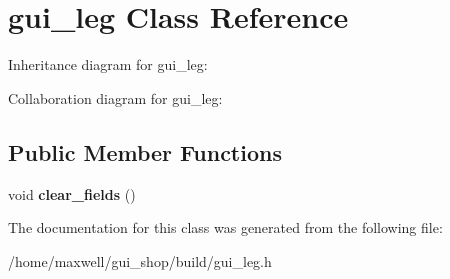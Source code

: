 \hypertarget{classgui__leg}{}\section{gui\+\_\+leg Class Reference}
\label{classgui__leg}


Inheritance diagram for gui\+\_\+leg\+:


Collaboration diagram for gui\+\_\+leg\+:
\subsection*{Public Member Functions}
\begin{DoxyCompactItemize}
\item 
void {\bfseries clear\+\_\+fields} ()\hypertarget{classgui__leg_a4e5a273526ed9783c7c7aaa1b33acc19}{}\label{classgui__leg_a4e5a273526ed9783c7c7aaa1b33acc19}

\end{DoxyCompactItemize}


The documentation for this class was generated from the following file\+:\begin{DoxyCompactItemize}
\item 
/home/maxwell/gui\+\_\+shop/build/gui\+\_\+leg.\+h\end{DoxyCompactItemize}
